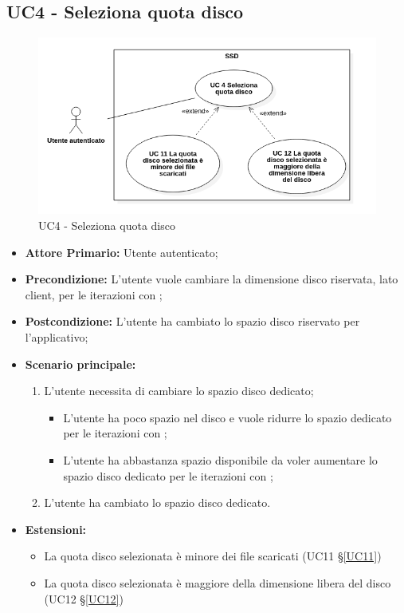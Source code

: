 \subsection{UC4 - Seleziona quota disco}
\begin{figure}[H]
    \centering
    \includegraphics[scale = 0.6]{components/img/UC4.png}
    \caption{UC4 - Seleziona quota disco}
\end{figure}
\begin{itemize}
\item \textbf{Attore Primario:} Utente autenticato;
\item \textbf{Precondizione:} L'utente vuole cambiare la dimensione disco riservata, lato client, per le iterazioni con ;
\item \textbf{Postcondizione:} L'utente ha cambiato lo spazio disco riservato per l'applicativo;
\item \textbf{Scenario principale:}
    \begin{enumerate}
    \item L'utente necessita di cambiare lo spazio disco 		dedicato;
    	\begin{itemize}
    	\item L'utente ha poco spazio nel disco e vuole ridurre lo spazio dedicato per le iterazioni con ;
    	\item L'utente ha abbastanza spazio disponibile da voler aumentare lo spazio disco dedicato per le iterazioni con ;
    	\end{itemize}
    \item L'utente ha cambiato lo spazio disco dedicato.		
    \end{enumerate}
\item \textbf{Estensioni:}
	\begin{itemize}
		\item La quota disco selezionata è minore dei file scaricati (UC11 \S{}\ref{UC11})
		\item La quota disco selezionata è maggiore della dimensione libera del disco (UC12 \S{}\ref{UC12})
	\end{itemize}
\end{itemize}